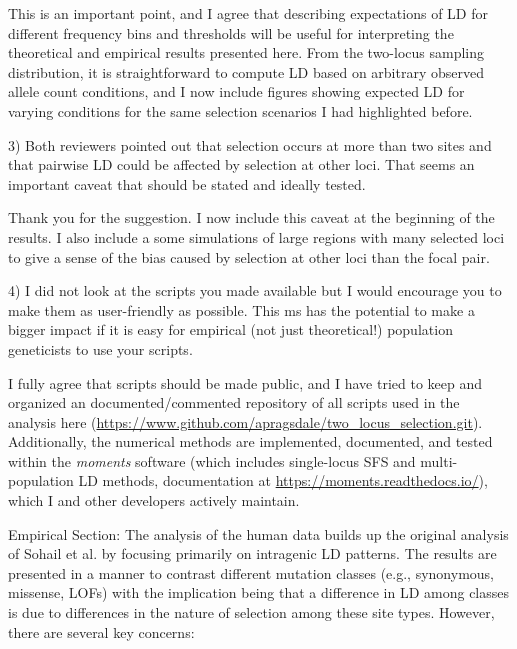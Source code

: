 \documentclass{article}
\newenvironment{response}%
  {\list{}{\leftmargin=0.5in\rightmargin=0.5in\color{blue}}\item[]}%
  {\endlist}
\begin{document}
\begin{response}
    This is an important point, and I agree that describing expectations of LD
    for different frequency bins and thresholds will be useful for interpreting
    the theoretical and empirical results presented here. From the two-locus
    sampling distribution, it is straightforward to compute LD based on
    arbitrary observed allele count conditions, and I now include figures showing
    expected LD for varying conditions for the same selection scenarios I had
    highlighted before.
\end{response}

3) Both reviewers pointed out that selection occurs at more than two sites and
that pairwise LD could be affected by selection at other loci. That seems an
important caveat that should be stated and ideally tested.

\begin{response}
    Thank you for the suggestion. I now include this caveat at the beginning
    of the results. I also include a some simulations of large regions with
    many selected loci to give a sense of the bias caused by selection at other
    loci than the focal pair.
\end{response}

4) I did not look at the scripts you made available but I would encourage you
to make them as user-friendly as possible. This ms has the potential to make a
bigger impact if it is easy for empirical (not just theoretical!) population
geneticists to use your scripts.

\begin{response}
    I fully agree that scripts should be made public, and I have tried to keep
    and organized an documented/commented repository of all scripts used in the
    analysis here (\url{https://www.github.com/apragsdale/two_locus_selection.git}).
    Additionally, the numerical methods are implemented, documented, and tested
    within the \emph{moments} software (which includes single-locus SFS and
    multi-population LD methods, documentation at \url{https://moments.readthedocs.io/}),
    which I and other developers actively maintain.
\end{response}

Empirical Section: The analysis of the human data builds up the original
analysis of Sohail et al. by focusing primarily on intragenic LD patterns. The
results are presented in a manner to contrast different mutation classes (e.g.,
synonymous, missense, LOFs) with the implication being that a difference in LD
among classes is due to differences in the nature of selection among these site
types. However, there are several key concerns:
\end{document}
